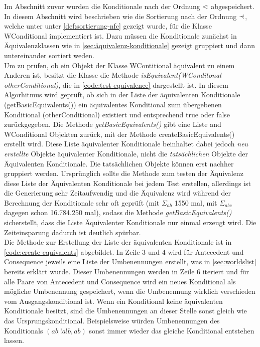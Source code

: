 \documentclass[12pt,a4paper]{article}
\newcommand\dotl{\mathrel{%
    \mathchoice{\QEQ}{\QEQ}{\QEQ}{\QEQ}%
}}
\def\QEQ{{%
    \setbox0\hbox{<}%
    \rlap{\hbox to \wd0{\hss \raisebox {0.1pt}{$\ \cdot$\hss}}}\box0
}}
\newcommand\rdotl{\mathrel{%
    \mathchoice{\RQEQ}{\RQEQ}{\RQEQ}{\RQEQ}%
}}
\def\RQEQ{{%
    \setbox0\hbox{$\prec$}%
    \rlap{\hbox to \wd0{\hss \raisebox {0.01pt}{$\ \cdot$\hss}}}\box0
}}
\begin{document}
Im Abschnitt zuvor wurden die Konditionale nach der Ordnung $\dotl$ abgespeichert. In diesem Abschnitt wird beschrieben wie die Sortierung nach der Ordnung $\rdotl$, welche unter unter \autoref{def:sortierung-nfc} gezeigt wurde, für die Klasse WConditional implementiert ist. Dazu müssen die Konditionale zunächst in Äquivalenzklassen wie in \autoref{sec:äquivalenz-konditionale} gezeigt gruppiert und dann untereinander sortiert weden. \\
Um zu prüfen, ob ein Objekt der Klasse WContitional äquivalent zu einem Anderen ist, besitzt die Klasse die Methode \textit{isEquivalent(WConditonal otherConditional)}, die in \autoref{code:test-equivalence} dargestellt ist. In diesem Algorhitmus wird geprüft, ob sich in der Liste der äquivalenten Konditionale (getBasicEquivalents()) ein äquivalentes Konditional zum übergebenen Konditional (otherConditional) existiert und entsprechend true oder false zurückgegeben. Die Methode \textit{getBasicEquivalents()} gibt eine Liste and WConditional Objekten zurück, mit der Methode createBasicEquivalents() erstellt wird. Diese Liste äquivalenter Konditionale beinhaltet dabei jedoch \textit{neu erstellte} Objekte äquivalenter Konditionale, nicht die \textit{tatsächlichen} Objekte der Äquivalenten Konditionale. Die tatsächlichen Objekte können erst nachher gruppiert werden. Ursprünglich sollte die Methode zum testen der Äquivalenz diese Liste der Äquivalenten Konditionale bei jedem Test erstellen, allerdings ist die Generierung sehr Zeitaufwendig und die Äquivalenz wird während der Berechnung der Konditionale sehr oft geprüft (mit $\Sigma_{ab}$ 1550 mal, mit $\Sigma_{abc}$ dagegen schon 16.784.250 mal), sodass die Methode \textit{getBasicEquivalents()} sicherstellt, dass die Liste Äquivalenter Konditionale nur einmal erzeugt wird. Die Zeiteinsparung dadurch ist deutlich spürbar.\\ 
Die Methode zur Erstellung der Liste der äquivalenten Konditionale ist in \autoref{code:create-equivalents} abgebildet. In Zeile 3 und 4 wird für Antecedent und Consequence jeweils eine Liste der Umbenennungen erstellt, was in \autoref{sec:worldslist} bereits erklärt wurde. Dieser Umbenennungen werden in Zeile 6 iteriert und für alle Paare von Antecedent und Consequence wird ein neues Konditional als mögliche Umbenennung gespeichert, wenn die Umbenennung wirklich verschieden vom Ausgangskonditional ist. Wenn ein Konditional keine äquivalenten Konditionale besitzt, sind die Umbenennungen an dieser Stelle sonst gleich wie das Ursprungskonditional. Beispielsweise würden Umbenennungen des Konditionals $(ab|!a!b,ab)$ sonst immer wieder das gleiche Konditional entstehen lassen.
\end{document}
